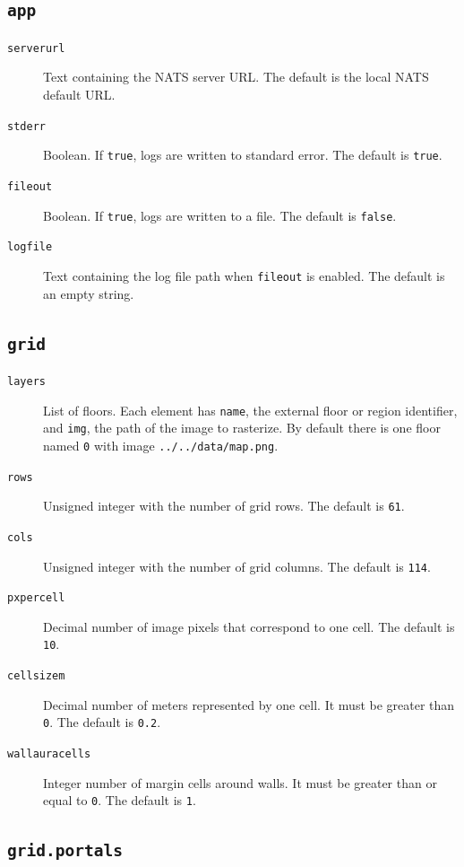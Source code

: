 \documentclass[12pt,a4paper]{report}
\begin{document}
\subsection{\texttt{app}}

\begin{description}
\item[\texttt{serverurl}] Text containing the NATS server URL. The default is
the local NATS default URL.
\item[\texttt{stderr}] Boolean. If \texttt{true}, logs are written to standard
error. The default is \texttt{true}.
\item[\texttt{fileout}] Boolean. If \texttt{true}, logs are written to a file.
The default is \texttt{false}.
\item[\texttt{logfile}] Text containing the log file path when
\texttt{fileout} is enabled. The default is an empty string.
\end{description}

\subsection{\texttt{grid}}

\begin{description}
\item[\texttt{layers}] List of floors. Each element has \texttt{name}, the
external floor or region identifier, and \texttt{img}, the path of the image to
rasterize. By default there is one floor named \texttt{0} with image
\texttt{../../data/map.png}.
\item[\texttt{rows}] Unsigned integer with the number of grid rows. The default
is \texttt{61}.
\item[\texttt{cols}] Unsigned integer with the number of grid columns. The
default is \texttt{114}.
\item[\texttt{pxpercell}] Decimal number of image pixels that correspond to one
cell. The default is \texttt{10}.
\item[\texttt{cellsizem}] Decimal number of meters represented by one cell. It
must be greater than \texttt{0}. The default is \texttt{0.2}.
\item[\texttt{wallauracells}] Integer number of margin cells around walls. It
must be greater than or equal to \texttt{0}. The default is \texttt{1}.
\end{description}

\subsection{\texttt{grid.portals}}
\end{document}
